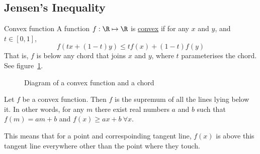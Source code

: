\documentclass[../Main.tex]{subfiles}
\begin{document}
\subsection{Jensen's Inequality}
\begin{definition}{Convex function}
    A function $f : \R \mapsto \R$ is \underline{convex} if for any $x$ and $y$, and $t \in [0, 1]$,
    \begin{equation*}
        f(tx + (1-t)y) \leq tf(x) + (1-t) f(y)
    \end{equation*}
    That is, $f$ is below any chord that joins $x$ and $y$, where $t$ parameterises the chord. See figure~\ref{figConvexCurve}.
\end{definition}
\begin{figure}[ht]
    \centering
    \caption{Diagram of a convex function and a chord}
    \label{figConvexCurve}
\end{figure}
\begin{proposition}
    Let $f$ be a convex function. Then $f$ is the supremum of all the lines lying below it. In other words, for any $m$ there exist real numbers $a$ and $b$ such that $f(m) = am+b$ and $f(x) \geq ax + b~\forall x$.
    \label{propTangentBelowConvex}
\end{proposition}
This means that for a point and correspoinding tangent line, $f(x)$ is above this tangent line everywhere other than the point where they touch.
\end{document}
